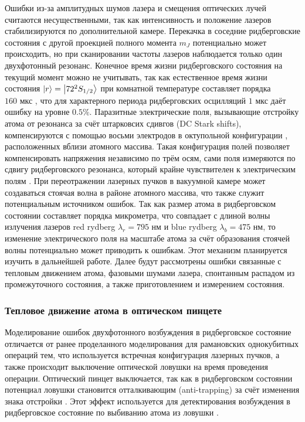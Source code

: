 Ошибки из-за амплитудных шумов лазера и смещения оптических лучей считаются несущественными, так как интенсивность и положение лазеров стабилизируются по дополнительной камере. Перекачка в соседние ридберговские состояния с другой проекцией полного момента $m_J$ \cite{Evered:2023aa} потенциально может происходить, но при сканировании частоты лазеров наблюдается только один двухфотонный резонанс. Конечное время жизни ридберговского состояния на текущий момент можно не учитывать, так как естественное время жизни состояния $\left| r \right\rangle = \left| 72^{2}S_{1/2} \right\rangle$ при комнатной температуре составляет порядка $160\text{ мкс}$ \cite{Ryabtsev_BBR}, что для характерного периода ридберговских осцилляций $1\text{ мкс}$ даёт ошибку на уровне $0.5 \%$. Паразитные электрические поля, вызывающие отстройку атома от резонанса за счёт штарковсих сдивгов (DC Stark shifts), компенсируются с помощью восьми электродов в октупольной конфигурации \cite{Beguin}, расположенных вблизи атомного массива. Такая конфигурация полей позволяет компенсировать напряжения независимо по трём осям, сами поля измеряются по сдвигу ридберговского резонанса, который крайне чувствителен к электрическим полям \cite{Beguin}. При переотражении лазерных пучков в вакуумной камере может создаваться стоячая волна в районе атомного массива, что также служит потенциальным источником ошибок. Так как размер атома в ридберговском состоянии составляет порядка микрометра, что совпадает с длиной волны излучения лазеров red rydberg $\lambda_r = 795 \text{ нм}$ и blue rydberg $\lambda_b = 475 \text{ нм}$, то изменение электрического поля на масштабе атома за счёт образования стоячей волны потенциально может приводить к ошибкам. Этот механизм  планируется изучить в дальнейшей работе. Далее будут рассмотрены  ошибки связанные с тепловым движением атома, фазовыми шумами лазера, спонтанным распадом из промежуточного состояния, а также приготовлением и измерением состояния. 


\subsubsection{Тепловое движение атома в оптическом пинцете}

Моделирование ошибок двухфотонного возбуждения в ридберговское состояние отличается от ранее проделанного моделирования для рамановских однокубитных операций тем, что используется встречная конфигурация лазерных пучков, а также происходит выключение оптической ловушки на время проведения операции. Оптический пинцет выключается, так как в ридберговском состоянии потенциал ловушки становится отталкивающим (anti-trapping) за счёт изменения знака отстройки \cite{Browayes,Beguin,grimm1999optical}. Этот эффект используется для детектирования возбуждения в ридберговское состояние по выбиванию атома из ловушки \cite{Beguin}.

